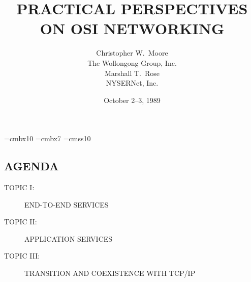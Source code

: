 

\def\emph#1{\underline{#1}}

\font\xx=cmbx10
\font\yy=cmbx7
\font\sf=cmss10

\raggedright


\let\tradeNAMfont=\relax
\let\tradeORGfont=\relax

\makeatletter
\def\@part[#1]#2{%
    \stepcounter{part}
    \begin{center}
	\Large\bf\partext{} \thepart\\
	\huge\bf #2%
    \end{center}
    \vskip1.25in plus.25in
}

\def\dotopic#1{\doPT{TOPIC}{#1}
\stepcounter{topic}\setcounter{slide}{0}}
\def\doparts{\doPT{PART}{0}}

\def\doPT#1#2{%
    \def\partext{#1}%
    \setcounter{part}{#2}%
}

\def\partext{PART}
\makeatother



\title	{PRACTICAL PERSPECTIVES\\ ON OSI NETWORKING}
\author	{Christopher W.~Moore\\ The Wollongong Group, Inc.\\[0.25in]
	 Marshall T.~Rose\\ NYSERNet, Inc.}
\date	{October 2--3, 1989}
\maketitlepage

\setcounter{slide}{-1}

\begin{bwslide}
\part*	{AGENDA}\bf

\begin{description}
\item[TOPIC I:]		END-TO-END SERVICES

\item[TOPIC II:]	APPLICATION SERVICES

\item[TOPIC III:]	TRANSITION AND COEXISTENCE WITH TCP/IP
\end{description}
\end{bwslide}

















